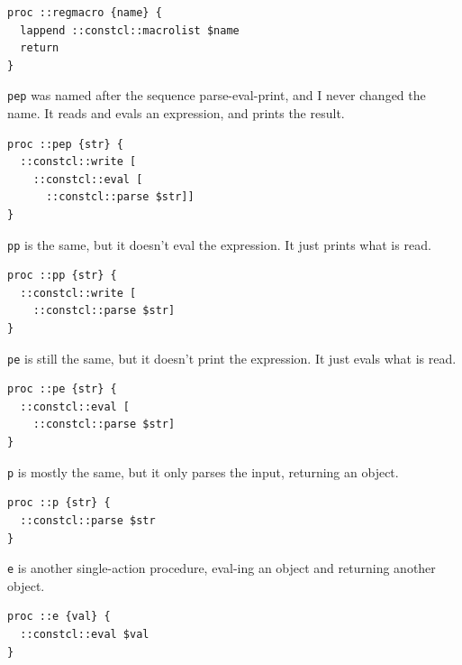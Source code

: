 \documentclass[twoside,9pt]{report}
\begin{document}
\noindent\makebox[\linewidth]{\rule{\linewidth}{0.4pt}}
\begin{lstlisting}
proc ::regmacro {name} {
  lappend ::constcl::macrolist $name
  return
}
\end{lstlisting}
\noindent\makebox[\linewidth]{\rule{\linewidth}{0.4pt}}

\texttt{pep} was named after the sequence parse-eval-print, and I never changed the name. It reads and evals an expression, and prints the result.

\noindent\makebox[\linewidth]{\rule{\linewidth}{0.4pt}}
\begin{lstlisting}
proc ::pep {str} {
  ::constcl::write [
    ::constcl::eval [
      ::constcl::parse $str]]
}
\end{lstlisting}
\noindent\makebox[\linewidth]{\rule{\linewidth}{0.4pt}}

\texttt{pp} is the same, but it doesn't eval the expression. It just prints what is read.

\noindent\makebox[\linewidth]{\rule{\linewidth}{0.4pt}}
\begin{lstlisting}
proc ::pp {str} {
  ::constcl::write [
    ::constcl::parse $str]
}
\end{lstlisting}
\noindent\makebox[\linewidth]{\rule{\linewidth}{0.4pt}}

\texttt{pe} is still the same, but it doesn't print the expression. It just evals what is read.

\noindent\makebox[\linewidth]{\rule{\linewidth}{0.4pt}}
\begin{lstlisting}
proc ::pe {str} {
  ::constcl::eval [
    ::constcl::parse $str]
}
\end{lstlisting}
\noindent\makebox[\linewidth]{\rule{\linewidth}{0.4pt}}

\texttt{p} is mostly the same, but it only parses the input, returning an object.

\noindent\makebox[\linewidth]{\rule{\linewidth}{0.4pt}}
\begin{lstlisting}
proc ::p {str} {
  ::constcl::parse $str
}
\end{lstlisting}
\noindent\makebox[\linewidth]{\rule{\linewidth}{0.4pt}}

\texttt{e} is another single-action procedure, eval-ing an object and returning another object.

\noindent\makebox[\linewidth]{\rule{\linewidth}{0.4pt}}
\begin{lstlisting}
proc ::e {val} {
  ::constcl::eval $val
}
\end{lstlisting}
\noindent\makebox[\linewidth]{\rule{\linewidth}{0.4pt}}
\end{document}
